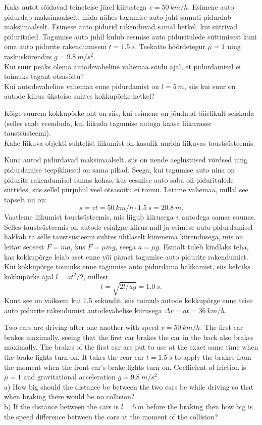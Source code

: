 
Kaks autot sõidavad teineteise järel kiirustega $v=\SI{50}{km/h}$. Esimene auto pidurdab maksimaalselt, mida nähes tagumise auto juht samuti pidurdab maksimaalselt. Esimese auto pidurid rakenduvad samal hetkel, kui süttivad pidurituled. Tagumise auto juhil kulub eesmise auto piduritulede süttimisest kuni oma auto pidurite rakendumiseni $t=\SI{1,5}{s}$. Teekatte hõõrdetegur $\mu=1$ ning raskuskiirendus $g=\SI{9,8}{m/s^2}$.\\
\osa Kui suur peaks olema autodevaheline vahemaa sõidu ajal, et pidurdamisel ei toimuks tagant otsasõitu?\\
\osa Kui autodevaheline vahemaa enne pidurdamist on $l=\SI{5}{m}$, siis kui suur on autode kiirus üksteise suhtes kokkupõrke hetkel?

\hint
\osa Kõige suurem kokkupõrke oht on siis, kui esimene on jõudnud täielikult seiskuda (selles saab veenduda, kui liikuda tagumise autoga kaasa liikuvasse taustsüsteemi).\\
\osa Kahe liikuva objekti suhtelist liikumist on kasulik uurida liikuvas taustsüsteemis.

\solu
\osa Kuna autod pidurdavad maksimaalselt, siis on nende aeglustused võrdsed ning pidurdamise teepikkused on sama pikad. Seega, kui tagumise auto nina on pidurite rakendumisel samas kohas, kus eesmise auto saba oli piduritulede süttides, siis sellel piirjuhul veel otsasõitu ei toimu. Leiame vahemaa, millal see täpselt nii on:
\[
s=vt=\SI{50}{km/h}\cdot\SI{1,5}{s}=\SI{20,8}{m}.
\]
\osa Vaatleme liikumist taustsüsteemis, mis liigub kiirusega $v$ autodega samas suunas. Selles taustsüsteemis on autode esialgne kiirus null ja esimese auto pidurdamisel hakkab ta selle taustsüsteemi suhtes ühtlaselt kiirenema kiirendusega, mis on leitav seosest $F=ma$, kus $F=\mu mg$, seega $a=\mu g$. Esmalt tuleb kindlaks teha, kas kokkupõrge leiab aset enne või pärast tagumise auto pidurite rakendumist. Kui kokkupõrge toimuks enne tagumise auto pidurdama hakkamist, siis kehtiks kokkupõrke ajal $l=at^2/2$, millest
\[
t=\sqrt{2l/ug}=\SI{1.0}{s}.
\]
Kuna see on väiksem kui \num{1,5} sekundit, siis toimub autode kokkupõrge enne teise auto pidurite rakendumist autodevahelise kiirusega $\Delta v=at=\SI{36}{km/h}$.

Two cars are driving after one another with speed $v=\SI{50}{km/h}$. The first car brakes maximally, seeing that the first car brakes the car in the back also brakes maximally. The brakes of the first car are put to use at the exact same time when the brake lights turn on. It takes the rear car $t=\SI{1,5}{s}$ to apply the brakes from the moment when the front car’s brake lights turn on. Coefficient of friction is $\mu=1$ and gravitational acceleration $g=\SI{9,8}{m/s^2}$.\\
a) How big should the distance be between the two cars be while driving so that when braking there would be no collision?\\
b) If the distance between the cars is $l=\SI{5}{m}$ before the braking then how big is the speed difference between the cars at the moment of the collision?

